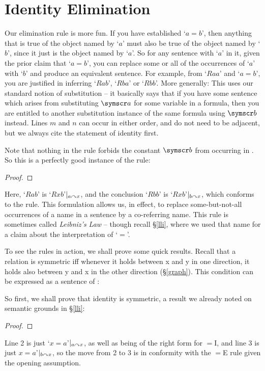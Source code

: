 \section{Identity Elimination} %
\label{idelim}


Our elimination rule is more fun. If you have established `$a=b$', then anything that is true of the object named by `$a$' must also be true of the object named by `$b$', since it just is the object named by `$a$'. So for any sentence with `$a$' in it, given the prior claim that `$a=b$', you can replace some or all of the occurrences of `$a$' with `$b$' and produce an equivalent sentence. For example, from `$Raa$' and `$a = b$', you are justified in inferring `$Rab$', `$Rba$' or `$Rbb$'. More generally:
This uses our standard notion of substitution – it basically says that if you have some sentence which arises from substituting $\meta{a}$ for some variable in a formula, then you are entitled to another substitution instance of the same formula using $\meta{b}$ instead. 
 Lines $m$ and $n$ can occur in either order, and do not need to be adjacent, but we always cite the statement of identity first. 

Note that nothing in the rule forbids the constant $\meta{b}$ from occurring in . So this is a perfectly good instance of the rule: \begin{proof}
\end{proof} Here, `$Rab$' is `$Rxb$'$\vert_{a\curvearrowright x}$, and the conclusion `$Rbb$' is `$Rxb$'$\vert_{b\curvearrowright x}$, which conforms to the rule. This formulation allows us, in effect, to replace some-but-not-all occurrences of a name in a sentence by a co-referring name.
This rule is sometimes called \emph{Leibniz's Law} – though recall §\ref{lli}, where we used that name for a claim about the interpretation of `$=$'.


To see the rules in action, we shall prove some quick results. Recall that a relation is symmetric iff whenever it holds between x and y in one direction, it holds also between y and x in the other direction (§\ref{graph}). This condition can be expressed as a sentence of \FOL: 


 So first, we shall prove that identity is symmetric, a result we already noted on semantic grounds in §\ref{lli}:
\begin{proof}
	\open
		\idi{}
	\close
\end{proof}
Line 2 is just `$x=a$'$\vert_{a\curvearrowright x}$, as well as being of the right form for $=$I, and line 3 is just $x=a$'$\vert_{b\curvearrowright x}$, so the move from 2 to 3 is in conformity with the $=$E rule given the opening assumption.

